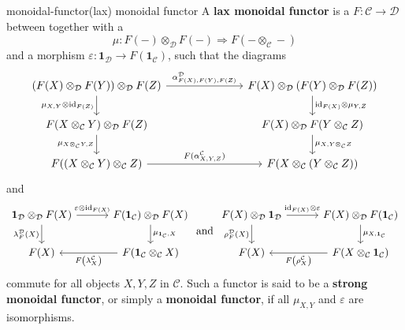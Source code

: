 \begin{topic}{monoidal-functor}{(lax) monoidal functor}
    A \textbf{lax monoidal functor} is a  $F : \mathcal{C} \to \mathcal{D}$ between  together with a 
    \[ \mu : F(-) \otimes_\mathcal{D} F(-) \Rightarrow F(- \otimes_\mathcal{C} -) \]
    and a morphism $\varepsilon : \textbf{1}_\mathcal{D} \to F(\textbf{1}_\mathcal{C})$, such that the diagrams
    \[ \begin{tikzcd}[column sep=7em]
        (F(X) \otimes_\mathcal{D} F(Y)) \otimes_\mathcal{D} F(Z) \arrow{r}{\alpha^\mathcal{D}_{F(X), F(Y), F(Z)}} \arrow[swap]{d}{\mu_{X, Y} \otimes \id_{F(Z)}} & F(X) \otimes_\mathcal{D} (F(Y) \otimes_\mathcal{D} F(Z)) \arrow{d}{\id_{F(X)} \otimes \mu_{Y, Z}} \\ F(X \otimes_\mathcal{C} Y) \otimes_\mathcal{D} F(Z) \arrow[swap]{d}{\mu_{X \otimes_\mathcal{C} Y, Z}} &  F(X) \otimes_\mathcal{D} F(Y \otimes_\mathcal{C} Z) \arrow{d}{\mu_{X, Y \otimes_\mathcal{C} Z}} \\ F((X \otimes_\mathcal{C} Y) \otimes_\mathcal{C} Z) \arrow{r}{F(\alpha^\mathcal{C}_{X, Y, Z})} & F(X \otimes_\mathcal{C} (Y \otimes_\mathcal{C} Z))
    \end{tikzcd} \]
    and
    \[ \begin{tikzcd}[column sep=3em]
        \textbf{1}_\mathcal{D} \otimes_\mathcal{D} F(X) \arrow{r}{\varepsilon \otimes \id_{F(X)}} \arrow[swap]{d}{\lambda^\mathcal{D}_F(X)} & F(\textbf{1}_\mathcal{C}) \otimes_\mathcal{D} F(X) \arrow{d}{\mu_{\textbf{1}_\mathcal{C}, X}} \\ F(X) & F(\textbf{1}_\mathcal{C} \otimes_\mathcal{C} X) \arrow{l}{F \left(\lambda^\mathcal{C}_X \right)}
    \end{tikzcd} \text{ and } \begin{tikzcd}[column sep=3em]
        F(X) \otimes_\mathcal{D} \textbf{1}_\mathcal{D} \arrow{r}{\id_{F(X)} \otimes \varepsilon} \arrow[swap]{d}{\rho^\mathcal{D}_F(X)} & F(X) \otimes_\mathcal{D} F(\textbf{1}_\mathcal{C}) \arrow{d}{\mu_{X, \textbf{1}_\mathcal{C}}} \\ F(X) & F(X \otimes_\mathcal{C} \textbf{1}_\mathcal{C}) \arrow{l}{F \left(\rho^\mathcal{C}_X \right)}
    \end{tikzcd} \]
    commute for all objects $X, Y, Z$ in $\mathcal{C}$. Such a functor is said to be a \textbf{strong monoidal functor}, or simply a \textbf{monoidal functor}, if all $\mu_{X, Y}$ and $\varepsilon$ are isomorphisms.
\end{topic}

